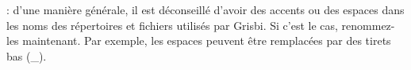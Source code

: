  : d'une manière générale, il est déconseillé d'avoir des accents ou des espaces dans les noms des répertoires et fichiers utilisés par Grisbi. Si c'est le cas, renommez-les maintenant. Par exemple, les espaces peuvent être remplacées par des tirets bas (\_). 


%
